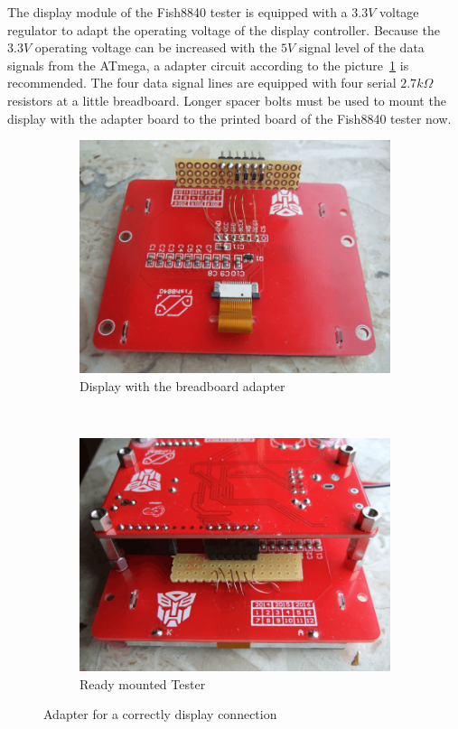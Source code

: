 The display module of the Fish8840 tester is equipped with a \(3.3V\) voltage regulator to adapt
the operating voltage of the display controller.
Because the \(3.3V\) operating voltage can be increased with the \(5V\) signal level of the data signals
from the ATmega, a adapter circuit according to the picture~\ref{fig:Fish8840Adapt} is recommended.
The four data signal lines are equipped with four serial \(2.7k\Omega\) resistors at a little
breadboard.
Longer spacer bolts must be used to mount the display with the adapter board to the printed board
of the Fish8840 tester now.

\begin{figure}[H]
  \begin{subfigure}[b]{.5\textwidth}
    \centering
    \includegraphics[width=1.\textwidth]{../PNG/Fish8840Adapt1.jpg}
    \caption{Display with the breadboard adapter}
  \end{subfigure}
  ~
  \begin{subfigure}[b]{.5\textwidth}
    \centering
    \includegraphics[width=1.\textwidth]{../PNG/Fish8840Adapt2.jpg}
    \caption{Ready mounted Tester}
  \end{subfigure}
  \caption{Adapter for a correctly display connection}
  \label{fig:Fish8840Adapt}
\end{figure}

